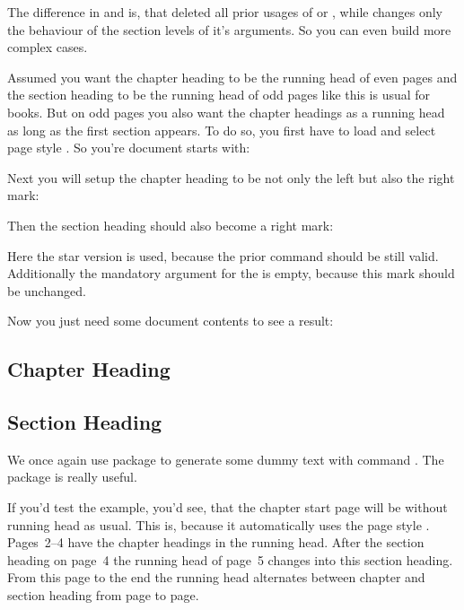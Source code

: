 The difference in  and  is, that
 deleted all prior usages of  or
, while  changes only the behaviour of the
section levels of it's arguments. So you can even build more complex cases.

\begin{Example}
  Assumed you want the chapter heading to be the running head of even pages
  and the section heading to be the running head of odd pages like this is
  usual for books. But on odd pages you also want the chapter headings as a
  running head as long as the first section appears. To do so, you first have
  to load  and select page style
  . So you're document starts with:
  Next you will setup the chapter heading to be not only the left but also the
  right mark:
\begin{lstcode}
\end{lstcode}
  Then the section heading should also become a right mark:
\begin{lstcode}
   \automark*[section]{}
\end{lstcode}
  Here the star version is used, because the prior  command
  should be still valid. Additionally the mandatory argument for the
   is empty, because this mark should be
  unchanged.

  Now you just need some document contents to see a result:
\begin{lstcode}
  \usepackage{lipsum}
  
  \chapter{Chapter Heading}
  \lipsum[1-20]
  \section{Section Heading}
  \lipsum[21-40]
  
\end{lstcode}
  We once again use package  to generate
  some dummy text with command . The package is
  really useful.

  If you'd test the example, you'd see, that the chapter start page will be
  without running head as usual. This is, because it automatically uses the
   page style . Pages~2--4 have
  the chapter headings in the running head. After the section heading on
  page~4 the running head of page~5 changes into this section heading. From
  this page to the end the running head alternates between chapter and section
  heading from page to page.
\end{Example}

